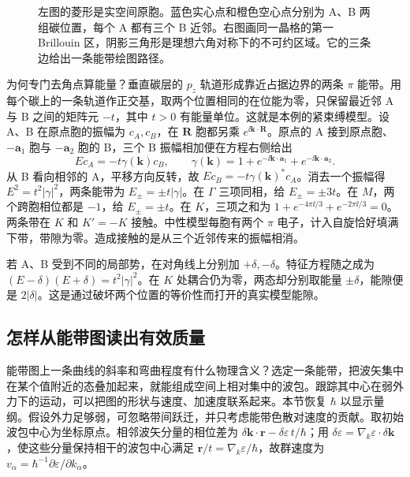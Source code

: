 \begin{figure}[htbp]
\centering

\caption{左图的菱形是实空间原胞。蓝色实心点和橙色空心点分别为 A、B 两组碳位置，每个 A 都有三个 B 近邻。右图画同一晶格的第一 Brillouin 区，阴影三角形是理想六角对称下的不可约区域。它的三条边给出一条能带绘图路径。}
\label{solids:graphene-zone}
\end{figure}

为何专门去角点算能量？垂直碳层的 $p_z$ 轨道形成靠近占据边界的两条 $\pi$ 能带。用每个碳上的一条轨道作正交基，取两个位置相同的在位能为零，只保留最近邻 A 与 B 之间的矩阵元 $-t$，其中 $t>0$ 有能量单位。这就是本例的紧束缚模型。设 A、B 在原点胞的振幅为 $c_A,c_B$，在 $\bm R$ 胞都另乘 $e^{\ii\bm k\cdot\bm R}$。原点的 A 接到原点胞、$-\bm a_1$ 胞与 $-\bm a_2$ 胞的 B，三个 B 振幅相加便在方程右侧给出
\[
 E c_A=-t\gamma(\bm k)c_B,\qquad
 \gamma(\bm k)=1+e^{-\ii\bm k\cdot\bm a_1}+e^{-\ii\bm k\cdot\bm a_2}.
\]
从 B 看向相邻的 A，平移方向反转，故 $Ec_B=-t\gamma(\bm k)^*c_A$。消去一个振幅得 $E^2=t^2|\gamma|^2$，两条能带为 $E_\pm=\pm t|\gamma|$。在 $\Gamma$ 三项同相，给 $E_\pm=\pm3t$。在 $M$，两个跨胞相位都是 $-1$，给 $E_\pm=\pm t$。在 $K$，三项之和为 $1+e^{-4\pi\ii/3}+e^{-2\pi\ii/3}=0$。两条带在 $K$ 和 $K'=-K$ 接触。中性模型每胞有两个 $\pi$ 电子，计入自旋恰好填满下带，带隙为零。造成接触的是从三个近邻传来的振幅相消。

若 A、B 受到不同的局部势，在对角线上分别加 $+\delta,-\delta$。特征方程随之成为 $(E-\delta)(E+\delta)=t^2|\gamma|^2$。在 $K$ 处耦合仍为零，两态却分别取能量 $\pm\delta$，能隙便是 $2|\delta|$。这是通过破坏两个位置的等价性而打开的真实模型能隙。


\subsection{怎样从能带图读出有效质量}
能带图上一条曲线的斜率和弯曲程度有什么物理含义？选定一条能带，把波矢集中在某个值附近的态叠加起来，就能组成空间上相对集中的波包。跟踪其中心在弱外力下的运动，可以把图的形状与速度、加速度联系起来。本节恢复 $\hbar$ 以显示量纲。假设外力足够弱，可忽略带间跃迁，并只考虑能带色散对速度的贡献。取初始波包中心为坐标原点。相邻波矢分量的相位差为 $\delta\bm k\cdot\bm r-\delta\varepsilon\,t/\hbar$；用 $\delta\varepsilon=\nabla_k\varepsilon\cdot\delta\bm k$，使这些分量保持相干的波包中心满足 $\bm r/t=\nabla_k\varepsilon/\hbar$，故群速度为 $v_\alpha=\hbar^{-1}\partial\varepsilon/\partial k_\alpha$。

